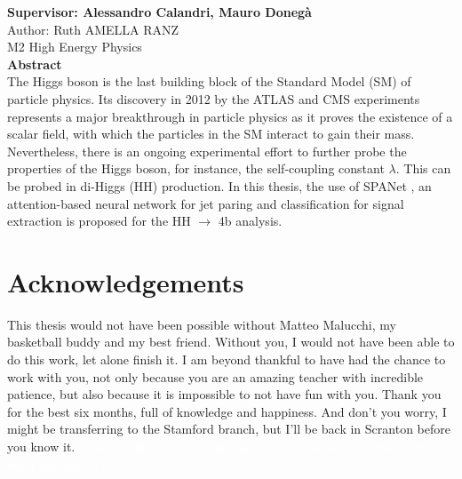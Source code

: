 \documentclass[11pt]{article}
\numberwithin{figure}{section}  %
\numberwithin{table}{section}   %
\numberwithin{equation}{section} %
\begin{document}
\begin{titlepage}
{\large\textbf{Supervisor: Alessandro Calandri, Mauro Donegà}}\\[1cm]
Author: Ruth AMELLA RANZ\\
M2 High Energy Physics
\\[1cm]
\textbf{Abstract}\\[1cm]
\justifying
The Higgs boson is the last building block of the Standard Model (SM) of particle physics. Its discovery in 2012 by the ATLAS \cite{ATLASdecouvhiggs} and CMS \cite{CMShiggsdecouv} experiments represents a major breakthrough in particle physics as it proves the existence of a scalar field, with which the particles in the SM interact to gain their mass. Nevertheless,  there is an ongoing experimental effort to further probe the properties of the Higgs boson, for instance, the self-coupling constant $\lambda$. This can be probed in di-Higgs (HH) production. In this thesis, the use of SPANet \cite{SPANet}, an attention-based neural network for jet paring and classification for signal extraction is proposed for the HH $\to$ 4b analysis. 

\end{titlepage}

\newpage
{}
\tableofcontents
{}
\pagestyle{fancy}
\fancyhf{}
\fancyhead[L]{\rightmark}
\fancyfoot[C]{\thepage}
\setlength{\headheight}{13.59999pt}
\addtolength{\topmargin}{-1.59999pt}
\setlength{\headheight}{25.22153pt}
\addtolength{\topmargin}{-11.62154pt}

\newpage















\section{Acknowledgements}

This thesis would not have been possible without Matteo Malucchi, my basketball buddy and my best friend. Without you, I would not have been able to do this work, let alone finish it. I am beyond thankful to have had the chance to work with you, not only because you are an amazing teacher with incredible patience, but also because it is impossible to not have fun with you. Thank you for the best six months, full of knowledge and happiness. And don't you worry, I might be transferring to the Stamford branch, but I'll be back in Scranton before you know it. \textcolor{white}{This real-life version of Jim and Pam cannot be away from each other for that long.}
\end{document}
